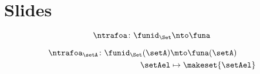 
\section{Slides}


\begin{forslides}

  \begin{equation}
            \label{eq:ex_nt_1}
            \ntrafoa \colon \funid_\Set \nto \funa
        \end{equation}
        
        \begin{equation}
            \label{eq:ex_nt_2}
            \begin{aligned}
                \ntrafoa_\setA \colon \funid_\Set(\setA) & \mto \funa(\setA) \\
                \setAel                                  & \mapsto \makeset{\setAel}
            \end{aligned}
        \end{equation}
        
        
\end{forslides}
